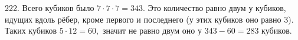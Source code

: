 222. Всего кубиков было $7\cdot7\cdot7=343.$ Это количество равно двум у кубиков, идущих вдоль рёбер, кроме первого и последнего (у этих кубиков оно равно 3).
Таких кубиков $5\cdot12=60,$ значит не равно двум оно у $343-60=283$ кубиков.\\
